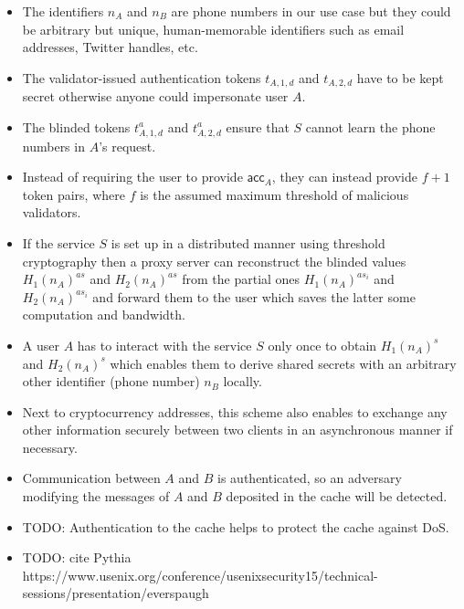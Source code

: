 \documentclass[11pt,letterpaper]{article}
\theoremstyle{definition}
\newcommand{\acc}{\mathsf{acc}}
\begin{document}
\begin{itemize}

  \item The identifiers $n_A$ and $n_B$ are phone numbers in our use case but
        they could be arbitrary but unique, human-memorable identifiers such as
        email addresses, Twitter handles, etc.

  \item The validator-issued authentication tokens $t_{A,1,d}$ and $t_{A,2,d}$
        have to be kept secret otherwise anyone could impersonate user $A$.

  \item The blinded tokens $t_{A,1,d}^a$ and $t_{A,2,d}^a$ ensure that $S$
        cannot learn the phone numbers in $A$'s request.


  \item Instead of requiring the user to provide $\acc_A$, they can instead provide $f+1$ token pairs, where $f$ is the assumed maximum threshold of malicious validators.

  \item If the service $S$ is set up in a distributed manner using threshold
        cryptography then a proxy server can reconstruct the blinded values
        $H_1(n_A)^{as}$ and $H_2(n_A)^{as}$ from the partial ones $H_1(n_A)^{as_i}$
        and $H_2(n_A)^{as_i}$ and forward them to the user which saves the latter
        some computation and bandwidth.

  \item A user $A$ has to interact with the service $S$ only once to obtain
        $H_1(n_A)^s$ and $H_2(n_A)^s$ which enables them to derive shared secrets
        with an arbitrary other identifier (phone number) $n_B$ locally.

  \item Next to cryptocurrency addresses, this scheme also enables to exchange
        any other information securely between two clients in an asynchronous manner
        if necessary.

  \item Communication between $A$ and $B$ is authenticated, so an adversary modifying the messages of $A$ and $B$ deposited in the cache will be detected.

  \item TODO: Authentication to the cache helps to protect the cache against DoS.

  \item TODO: cite Pythia https://www.usenix.org/conference/usenixsecurity15/technical-sessions/presentation/everspaugh

\end{itemize}
\end{document}
